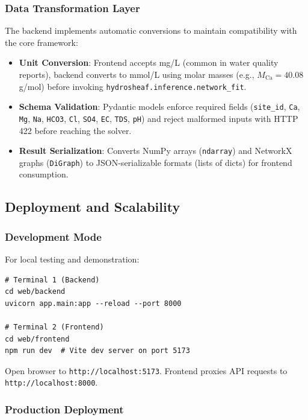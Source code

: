 \subsubsection{Data Transformation Layer}

The backend implements automatic conversions to maintain compatibility with the core framework:
\begin{itemize}
	\item \textbf{Unit Conversion}: Frontend accepts mg/L (common in water quality reports), backend converts to mmol/L using molar masses (e.g., $M_{\text{Ca}} = 40.08$ g/mol) before invoking \texttt{hydrosheaf.inference.network\_fit}.
	\item \textbf{Schema Validation}: Pydantic models enforce required fields (\texttt{site\_id}, \texttt{Ca}, \texttt{Mg}, \texttt{Na}, \texttt{HCO3}, \texttt{Cl}, \texttt{SO4}, \texttt{EC}, \texttt{TDS}, \texttt{pH}) and reject malformed inputs with HTTP 422 before reaching the solver.
	\item \textbf{Result Serialization}: Converts NumPy arrays (\texttt{ndarray}) and NetworkX graphs (\texttt{DiGraph}) to JSON-serializable formats (lists of dicts) for frontend consumption.
\end{itemize}

\subsection{Deployment and Scalability}

\subsubsection{Development Mode}

For local testing and demonstration:
\begin{verbatim}
# Terminal 1 (Backend)
cd web/backend
uvicorn app.main:app --reload --port 8000

# Terminal 2 (Frontend)
cd web/frontend
npm run dev  # Vite dev server on port 5173
\end{verbatim}

Open browser to \texttt{http://localhost:5173}. Frontend proxies API requests to\\\texttt{http://localhost:8000}.

\subsubsection{Production Deployment}

